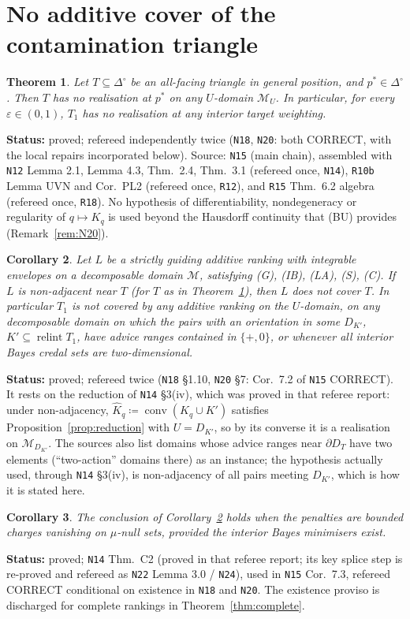 \documentclass[11pt]{article}
\newtheorem{theorem}{Theorem}[section]
\newtheorem{corollary}[theorem]{Corollary}
\theoremstyle{definition}
\theoremstyle{remark}
\newcommand{\Di}{\Delta^{\circ}}
\newcommand{\M}{\mathcal M}
\newcommand{\co}{\operatorname{conv}}
\newcommand{\relint}{\operatorname{relint}}
\newcommand{\src}[1]{\texttt{#1}}
\newcommand{\status}[1]{\par\smallskip\noindent\textbf{Status:} #1\par\smallskip}
\begin{document}
\section{No additive cover of the contamination triangle}\label{sec:main}

\begin{theorem}\label{thm:main}
Let $T\subseteq\Di$ be an all-facing triangle in general position, and $p^*\in\Di$. Then $T$ has no realisation at $p^*$ on any $U$-domain $\M_U$. In particular, for every $\varepsilon\in(0,1)$, $T_1$ has no realisation at any interior target weighting.
\end{theorem}
\status{proved; refereed independently twice (\src{N18}, \src{N20}: both CORRECT, with the local repairs incorporated below). Source: \src{N15} (main chain), assembled with \src{N12} Lemma 2.1, Lemma 4.3, Thm.~2.4, Thm.~3.1 (refereed once, \src{N14}), \src{R10b} Lemma UVN and Cor.~PL2 (refereed once, \src{R12}), and \src{R15} Thm.~6.2 algebra (refereed once, \src{R18}). No hypothesis of differentiability, nondegeneracy or regularity of $q\mapsto K_q$ is used beyond the Hausdorff continuity that (BU) provides (Remark~\ref{rem:N20}).}

\begin{corollary}\label{cor:coverage}
Let $L$ be a strictly guiding additive ranking with integrable envelopes on a decomposable domain $\M$, satisfying (G), (IB), (LA), (S), (C). If $L$ is non-adjacent near $T$ (for $T$ as in Theorem~\ref{thm:main}), then $L$ does not cover $T$. In particular $T_1$ is not covered by any additive ranking on the $U$-domain, on any decomposable domain on which the pairs with an orientation in some $D_{K'}$, $K'\subseteq\relint T_1$, have advice ranges contained in $\{+,0\}$, or whenever all interior Bayes credal sets are two-dimensional.
\end{corollary}
\status{proved; refereed twice (\src{N18} \S1.10, \src{N20} \S7: Cor.~7.2 of \src{N15} CORRECT). It rests on the reduction of \src{N14} \S3(iv), which was proved in that referee report: under non-adjacency, $\hat K_q\coloneqq\co(K_q\cup K')$ satisfies Proposition~\ref{prop:reduction} with $U=D_{K'}$, so by its converse it is a realisation on $\M_{D_{K'}}$. The sources also list domains whose advice ranges near $\partial D_T$ have two elements (``two-action'' domains there) as an instance; the hypothesis actually used, through \src{N14} \S3(iv), is non-adjacency of all pairs meeting $D_{K'}$, which is how it is stated here.}

\begin{corollary}\label{cor:charges}
The conclusion of Corollary~\ref{cor:coverage} holds when the penalties are bounded charges vanishing on $\mu$-null sets, provided the interior Bayes minimisers exist.
\end{corollary}
\status{proved; \src{N14} Thm.~C2 (proved in that referee report; its key splice step is re-proved and refereed as \src{N22} Lemma 3.0 / \src{N24}), used in \src{N15} Cor.~7.3, refereed CORRECT conditional on existence in \src{N18} and \src{N20}. The existence proviso is discharged for complete rankings in Theorem~\ref{thm:complete}.}
\end{document}
